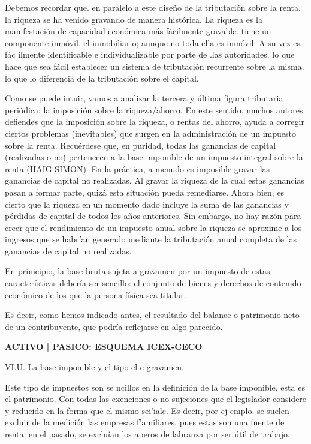 \documentclass[10pt,a4paper]{article}
\begin{document}
Debemos recordar que. en paralelo a este diseño de la tributación sobre la renta. la riqueza se ha venido gravando de manera histórica. La riqueza es la manifestación de capacidad económica más fácilmente gravable. tiene un componente inmóvil. el inmobiliario; aunque no toda ella es inmóvil. A su vez es fác ilmente identificable e individualizable por parte de .las autoridades. lo que hace que sea fácil establecer un sistema de tributación recurrente sobre la misma. lo que lo diferencia de la tributación sobre el capital.

Como se puede intuir, vamos a analizar la tercera y última figura tributaria periódica: la imposición sobre la riqueza/ahorro. En este sentido, muchos autores defiendes que la imposición sobre la riqueza, o rentas del ahorro, ayuda a corregir ciertos problemas (inevitables) que surgen en la administración de un impuesto sobre la renta. Recuérdese que, en puridad, todas las ganancias de capital (realizadas o no) pertenecen a la base imponible de un impuesto integral sobre la renta (HAIG-SIMON). En la práctica, a menudo es imposible gravar las ganancias de capital no realizadas. Al gravar la riqueza de la cual estas ganancias pasan a formar parte, quizá esta situación pueda remediarse. Ahora bien, es cierto que la riqueza en un momento dado incluye la suma de las ganancias y pérdidas de capital de todos los años anteriores. Sin embargo, no hay razón para creer que el rendimiento de un impuesto anual sobre la riqueza se aproxime a los ingresos que se habrían generado mediante la tributación anual completa de las ganancias de capital no realizadas.

En prinicipio, la base bruta sujeta a gravamen por un impuesto de estas características debería ser sencillo: el conjunto de bienes y derechos de contenido económico de los que la persona física sea titular. 

Es decir, como hemos indicado antes, el resultado del balance o patrimonio neto de un contribuyente, que podría reflejarse en algo parecido.

\textbf{ACTIVO | PASICO: ESQUEMA ICEX-CECO}

VI.U. La base imponible y el tipo el e gravamen.

Este tipo de impuestos son se ncillos en la definición de la base imponible, esta es el patrimonio. Con todas las exenciones o no sujeciones que el legislador considere y reducido en la forma que el mismo sei'iale. Es decir, por ej emplo. se suelen excluir de la medición las empresas f'amiliares, pues estas son una fuente de renta: en el pasado, se excluían los aperos de labranza por ser útil de trabajo.
\end{document}
